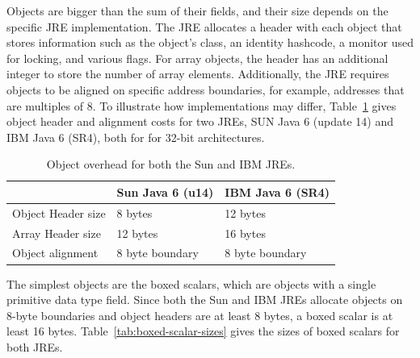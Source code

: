 Objects are bigger than the sum of their fields, and their size depends on the specific JRE implementation. The JRE allocates a header with each object that stores information such as the object's class, an identity hashcode, a monitor used for locking, and various flags. For array objects, the header has an additional integer to store the number of array elements. Additionally,  the JRE requires objects to be aligned on specific address boundaries, for example, addresses that are multiples of 8. To illustrate how implementations may differ, Table~\ref{tab:object-overhead} gives object header and alignment costs for two JREs, SUN Java 6 (update 14) and IBM Java 6 (SR4), both for for 32-bit architectures.
\begin{table}
  \centering
 \begin{tabular}{lll} \toprule
 	& Sun Java 6 (u14) & IBM Java 6 (SR4) \\ \midrule
 	Object Header size & 8 bytes & 12 bytes \\
 	Array Header size & 12 bytes & 16 bytes \\
 	Object alignment & 8 byte boundary & 8 byte boundary \\
 	\bottomrule
 \end{tabular}
  \caption{Object overhead for both the Sun and IBM JREs.}
  \label{tab:object-overhead}
\end{table} 
   
The simplest objects are the boxed scalars, which are objects with a single primitive data type field. Since both the Sun and IBM JREs allocate objects on 8-byte boundaries and object headers are at least 8 bytes, a boxed scalar is at least 16 bytes. Table~\ref{tab:boxed-scalar-sizes} gives the sizes of boxed scalars for both JREs.

